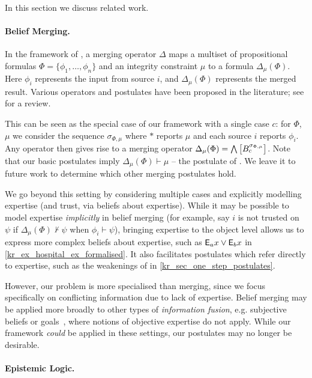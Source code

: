 In this section we discuss related work.

\paragraph{Belief Merging.}

In the framework of \textcite{konieczny2002merging}, a merging operator $\Delta$
maps a multiset of propositional formulas $\Phi = \{\phi_1,\ldots,\phi_n\}$ and
an integrity constraint $\mu$ to a formula $\Delta_\mu(\Phi)$. Here $\phi_i$
represents the input from source $i$, and $\Delta_\mu(\Phi)$ represents the
merged result. Various operators and postulates have been proposed in the
literature; see \cite{Konieczny_2011} for a review.

This can be seen as the special case of our framework with a single case $c$:
for $\Phi$, $\mu$ we consider the sequence $\sigma_{\Phi, \mu}$ where $\ast$
reports $\mu$ and each source $i$ reports $\phi_i$. Any operator then gives
rise to a merging operator $\Delta_\mu(\Phi) =
\bigwedge\left[{B^{\sigma_{\Phi,\mu}}_c}\right]$. Note that our basic postulates
imply $\Delta_\mu(\Phi) \vdash \mu$ -- the  postulate of
\textcite{konieczny2002merging}. We leave it to future work to determine which
other merging postulates hold.

We go beyond this setting by considering multiple cases and explicitly
modelling expertise (and trust, via beliefs about expertise). While it may be
possible to model expertise \emph{implicitly} in belief merging (for example,
say $i$ is not trusted on $\psi$ if $\Delta_\mu(\Phi) \not\vdash \psi$ when
$\phi_i \vdash \psi$), bringing expertise to the object level allows us to
express more complex beliefs about expertise, such as $\mathsf{E}_a{x} \lor \mathsf{E}_b{x}$ in
\cref{kr_ex_hospital_ex_formalised}. It also facilitates postulates which refer
directly to expertise, such as the weakenings of  in
\cref{kr_sec_one_step_postulates}.

However, our problem is more specialised than merging, since we focus
specifically on conflicting information due to lack of expertise. Belief
merging may be applied more broadly to other types of \emph{information
fusion}, e.g. subjective beliefs or goals~\cite{gregoire_fusion_2006},
where notions of objective expertise do not apply. While our framework
\emph{could} be applied in these settings, our postulates may no longer be
desirable.

\paragraph{Epistemic Logic.}

